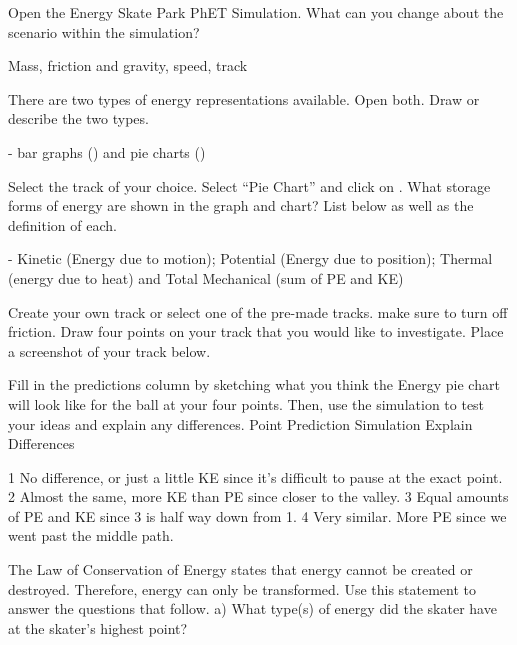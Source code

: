 \documentclass[]{exam}
\begin{document}
\begin{questions}
\begin{questions}
\question
Open the Energy Skate Park PhET Simulation. What can you change about the scenario within the simulation? 

\begin{solution}
    Mass, friction and gravity, speed, track
\end{solution}

\question
There are two types of energy representations available. Open both. Draw or describe the two types.

\begin{solution}
- bar graphs () and pie charts ()
\end{solution}
  
\question
Select the track of your choice. Select “Pie Chart”  and click on  .   What storage forms of energy are shown in the graph and chart? List below as well as the definition of each.

\begin{solution}
- Kinetic (Energy due to motion); Potential (Energy due to position); Thermal (energy due to heat) and Total Mechanical (sum of PE and KE)
\end{solution}



\question
Create your own track or select one of the pre-made tracks. make sure to turn off friction. Draw four points on your track that you would like to investigate.  Place a screenshot of your track below.

\question
Fill in the predictions column by sketching what you think the Energy pie chart will look like for the ball at your four points. Then, use the simulation to test your ideas and explain any differences. 
Point	Prediction	Simulation	Explain Differences

\begin{solution}
1	
 	No difference, or just a little KE since it’s difficult to pause at the exact point.
2	
 	Almost the same, more KE than PE since closer to the valley.
3	
 	Equal amounts of PE and KE since 3 is half way down from 1.
4	
 	Very similar. More PE since we went past the middle path.
\end{solution}

\question
The Law of Conservation of Energy states that energy cannot be created or destroyed. Therefore, energy can only be transformed. Use this statement to answer the questions that follow.
a) What type(s) of energy did the skater have at the skater’s highest point? 


\end{questions}
\end{questions}
\end{document}
